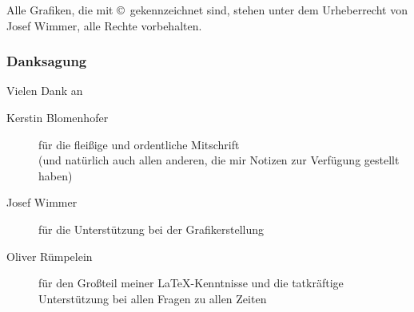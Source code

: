 Alle Grafiken, die mit \copyright ~gekennzeichnet sind, stehen unter
dem Urheberrecht von Josef Wimmer, alle Rechte vorbehalten.


\subsubsection*{Danksagung}
Vielen Dank an
\begin{description}
	\item[Kerstin Blomenhofer] für die fleißige und ordentliche Mitschrift\\
		(und natürlich auch allen anderen, die mir Notizen zur Verfügung gestellt haben)
	\item[Josef Wimmer] für die Unterstützung bei der Grafikerstellung
	\item[Oliver Rümpelein] für den Großteil meiner \LaTeX-Kenntnisse und
		die tatkräftige Unterstützung bei allen Fragen zu allen Zeiten
\end{description}

